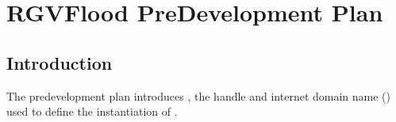 \documentclass[letterpaper,10pt,english]{sphinxmanual}
\begin{document}
\chapter{RGVFlood Pre\sphinxhyphen{}Development Plan}
\label{\detokenize{predevelopment/index:rgvflood-pre-development-plan}}\label{\detokenize{predevelopment/index::doc}}

\section{Introduction}
\label{\detokenize{predevelopment/introduction:introduction}}\label{\detokenize{predevelopment/introduction::doc}}
\sphinxAtStartPar
The predevelopment plan introduces {\hyperref[\detokenize{glossary:term-RGVFlood}]{}}, the handle and internet domain name ({\hyperref[\detokenize{glossary:term-RGVFlood.com}]{}}) used to define the {\hyperref[\detokenize{glossary:term-LRGV}]{}} instantiation of {\hyperref[\detokenize{glossary:term-REON.cc}]{}}.
\end{document}
